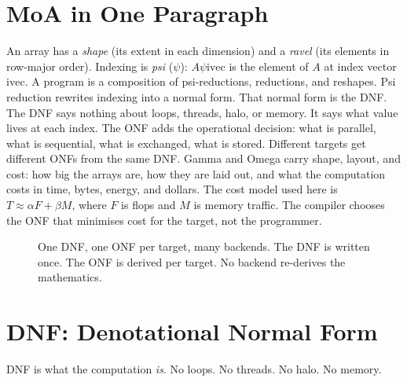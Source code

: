\documentclass[11pt]{article}
\begin{document}
\section{MoA in One Paragraph}
An array has a \emph{shape} (its extent in each dimension) and a \emph{ravel}
(its elements in row-major order). Indexing is \emph{psi} ($\psi$):
$A \psi \mathrm{ivec}$ is the element of $A$ at index vector $\mathrm{ivec}$.
A program is a composition of psi-reductions, reductions, and reshapes.
Psi reduction rewrites indexing into a normal form. That normal form is the
DNF. The DNF says nothing about loops, threads, halo, or memory. It says
what value lives at each index. The ONF adds the operational decision: what
is parallel, what is sequential, what is exchanged, what is stored. Different
targets get different ONFs from the same DNF. Gamma and Omega carry shape,
layout, and cost: how big the arrays are, how they are laid out, and what
the computation costs in time, bytes, energy, and dollars. The cost model
used here is $T \approx \alpha F + \beta M$, where $F$ is flops and $M$ is
memory traffic. The compiler chooses the ONF that minimises cost for the
target, not the programmer.

\begin{figure}[h]
\centering
{}
\caption{One DNF, one ONF per target, many backends. The DNF is written once.
The ONF is derived per target. No backend re-derives the mathematics.}
\label{fig:pipeline}
\end{figure}

\section{DNF: Denotational Normal Form}
DNF is what the computation \emph{is}. No loops. No threads. No halo.
No memory.
\end{document}
